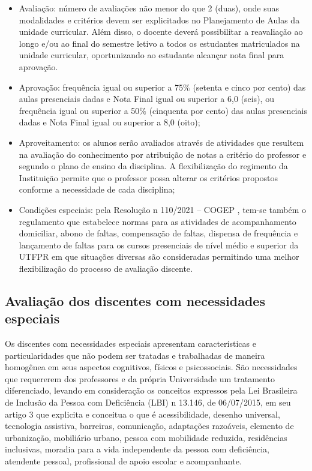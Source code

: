 \begin{itemize}
	\item Avaliação: número de avaliações não menor do que 2 (duas), onde suas modalidades e critérios devem ser explicitados no Planejamento de Aulas da unidade curricular. Além disso, o docente deverá possibilitar a reavaliação ao longo e/ou ao final do semestre letivo a todos os estudantes matriculados na unidade curricular, oportunizando ao estudante alcançar nota final para aprovação.
	\item Aprovação: frequência igual ou superior a 75$\%$ (setenta e cinco por cento) das aulas presenciais dadas e Nota Final igual ou superior a 6,0 (seis), ou frequência igual ou superior a 50$\%$ (cinquenta por cento) das aulas presenciais dadas e Nota Final igual ou superior a 8,0 (oito);
	\item Aproveitamento: os alunos serão avaliados através de atividades que resultem na avaliação do conhecimento por atribuição de notas a critério do professor e segundo o plano de ensino da disciplina. A flexibilização do regimento da Instituição permite que o professor possa alterar os critérios propostos conforme a necessidade de cada disciplina;
	\item  Condições especiais: pela Resolução n\textordmasculine{} 110/2021 – COGEP \cite{cogep110}, tem-se também o regulamento que estabelece normas para as atividades de acompanhamento domiciliar, abono de faltas, compensação de faltas, dispensa de frequência e lançamento de faltas para os cursos presenciais de nível médio e superior da UTFPR em que situações diversas são consideradas permitindo uma melhor flexibilização do processo de avaliação discente.
\end{itemize}

\subsection{Avaliação dos discentes com necessidades especiais}

Os discentes com necessidades especiais apresentam características e particularidades que não podem ser tratadas e trabalhadas de maneira homogênea em seus aspectos cognitivos, físicos e psicossociais. São necessidades que requererem dos professores e da própria Universidade um tratamento diferenciado, levando em consideração os conceitos expressos pela Lei Brasileira de Inclusão da Pessoa com Deficiência (LBI) n\textordmasculine{} 13.146, de 06/07/2015, em seu artigo 3\textordmasculine{} que explicita e conceitua o que é acessibilidade, desenho universal, tecnologia assistiva, barreiras, comunicação, adaptações razoáveis, elemento de urbanização, mobiliário urbano, pessoa com mobilidade reduzida, residências inclusivas, moradia para a vida independente da pessoa com deficiência, atendente pessoal, profissional de apoio escolar e acompanhante.

